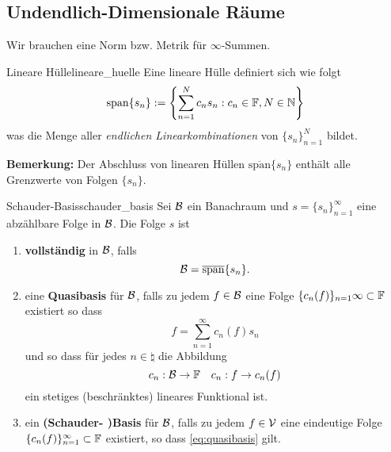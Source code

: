 \subsection{Undendlich-Dimensionale Räume}

Wir brauchen eine Norm bzw. Metrik für $\infty$-Summen.

\begin{boringDef}{Lineare Hülle}{lineare_huelle}
  Eine lineare Hülle definiert sich wie folgt
  \begin{equation}
    \mathrm{span}\{s_n\} := \left\{ \sum\limits_{n=1}^N c_n s_n : c_n \in \mathbb{F}, N \in \mathbb{N} \right\}
  \end{equation}
  was die Menge aller \textit{endlichen Linearkombinationen} von $\{s_n\}_{n=1}^N$ bildet.

  \textbf{Bemerkung:} Der Abschluss von linearen Hüllen $\overline{\mathrm{span}}\{s_n\}$ enthält alle Grenzwerte von Folgen $\{s_n\}$.
\end{boringDef}

\begin{boringDef}{Schauder-Basis}{schauder_basis}
  Sei $\mathcal{B}$ ein Banachraum und $s = \{s_n\}_{n=1}^\infty$ eine abzählbare Folge in $\mathcal{B}$.
  Die Folge $s$ ist
  \begin{enumerate}
    \item \textbf{vollständig} in $\mathcal{B}$, falls
    \begin{equation*}
      \mathcal{B} = \overline{\mathrm{span}}\{s_n\}.
    \end{equation*}
    \item eine \textbf{Quasibasis} für $\mathcal{B}$, falls zu jedem $f\in\mathcal{B}$ eine Folge $\{c_n(f)\}_{n=1}{\infty} \subset \mathbb{F}$  existiert so dass
    \begin{equation}
      f = \sum\limits_{n=1}^\infty c_n(f) s_n\label{eq:quasibasis}
    \end{equation}
    und so dass für jedes $n \in \natural$ die Abbildung
    \begin{equation*}
       c_n : \mathcal{B} \to \mathbb{F} \quad c_n : f \to c_n(f)
    \end{equation*}
    ein stetiges (beschränktes) lineares Funktional ist.
    \item ein \textbf{(Schauder- )Basis} für $\mathcal{B}$, falls zu jedem $f\in\mathcal{V}$ eine eindeutige Folge $\{c_n(f)\}_{n=1}^\infty \subset \mathbb{F}$ existiert, so dass \eqref{eq:quasibasis} gilt.
  \end{enumerate}
\end{boringDef}

